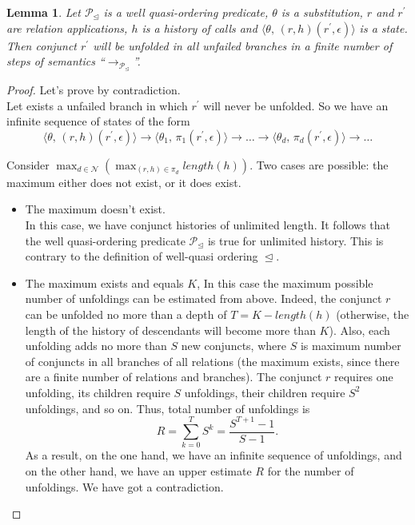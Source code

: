 \documentclass{article}[12pt]
\newcommand{\inbr}[1]{\langle #1 \rangle}
\newtheorem{lemma}[theorem]{Lemma}
\begin{document}
\begin{lemma}
\label{one-conj-lemma}
Let $\mathcal{P}_\trianglelefteq$ is a well quasi-ordering predicate, $\theta$ is a substitution, $r$ and $r^\prime$ are relation applications, $h$ is a history of calls and $\inbr{\theta,\, (r, h) (r^\prime, \epsilon)}$ is a state. Then conjunct $r^\prime$ will be unfolded in all unfailed branches in a finite number of steps of semantics ``$\rightarrow_{\mathcal{P}_\trianglelefteq}$''.
\end{lemma}
\begin{proof}
Let's prove by contradiction. \\
Let exists a unfailed branch in which $r^\prime$ will never be unfolded. So we have an infinite sequence of states of the form
\[
\inbr{\theta,\, (r, h) (r^\prime, \epsilon)} \rightarrow \inbr{\theta_1,\, \pi_1 (r^\prime, \epsilon)} \rightarrow \ldots \rightarrow \inbr{\theta_d,\, \pi_d (r^\prime, \epsilon)} \rightarrow \ldots
\]

Consider $\max_{d \in \mathcal{N}}(\max_{(r,h) \in \pi_d}length(h))$. Two cases are possible: the maximum either does not exist, or it does exist.

\begin{itemize}
    \item The maximum doesn't exist. \\
    In this case, we have conjunct histories of unlimited length. It follows that the well quasi-ordering predicate $\mathcal{P}_\trianglelefteq$ is true for unlimited history. This is contrary to the definition of well-quasi ordering $\trianglelefteq$.
    \item The maximum exists and equals $K$,
    In this case the maximum possible number of unfoldings can be estimated from above. Indeed, the conjunct $r$ can be unfolded no more than a depth of $ T = K - length(h)$ (otherwise, the length of the history of descendants will become more than $K$). Also, each unfolding adds no more than $S$ new conjuncts, where $S$ is maximum number of conjuncts in all branches of all relations (the maximum exists, since there are a finite number of relations and branches). The conjunct $r$ requires one unfolding, its children require $S$ unfoldings, their children require $S^2$ unfoldings, and so on. Thus, total number of unfoldings is
    \[
    R = \sum _{k=0}^{T}S^k = \frac{S^{T + 1} - 1}{S - 1}.
    \]
    As a result, on the one hand, we have an infinite sequence of unfoldings, and on the other hand, we have an upper estimate $R$ for the number of unfoldings. We have got a contradiction.
\end{itemize}

\end{proof}
\end{document}
